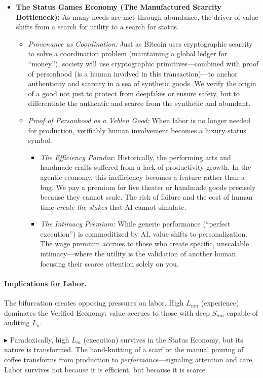 \documentclass[12pt, letter]{article}
\begin{document}
\begin{itemize}
    \item \textbf{The Status Games Economy (The Manufactured Scarcity Bottleneck):} As many needs are met through abundance, the driver of value shifts from a search for utility to a search for status.
    \begin{itemize}
        \item \textit{Provenance as Coordination:} Just as Bitcoin uses cryptographic scarcity to solve a coordination problem (maintaining a global ledger for ``money''), society will use cryptographic primitives---combined with proof of personhood (is a human involved in this transaction)---to anchor authenticity and scarcity in a sea of synthetic goods. We verify the origin of a good not just to protect from deepfakes or ensure safety, but to differentiate the authentic and scarce from the synthetic and abundant.
        \item \textit{Proof of Personhood as a Veblen Good:} When labor is no longer needed for production, verifiably human involvement becomes a luxury status symbol.
        \begin{itemize}
            \item \textit{The Efficiency Paradox:} Historically, the performing arts and handmade crafts suffered from a lack of productivity growth. In the agentic economy, this inefficiency becomes a feature rather than a bug. We pay a premium for live theater or handmade goods precisely because they cannot scale. The risk of failure and the cost of human time \emph{create the stakes} that AI cannot simulate.
            \item \textit{The Intimacy Premium:} While generic performance (``perfect execution'') is commoditized by AI, value shifts to personalization. The wage premium accrues to those who create specific, unscalable intimacy---where the utility is the validation of another human focusing their scarce attention solely on you.
        \end{itemize}
    \end{itemize}
\end{itemize}


\paragraph{Implications for Labor.}
The bifurcation creates opposing pressures on labor. High $L_{nm}$ (experience) dominates the Verified Economy: value accrues to those with deep $S_{nm}$ capable of auditing $L_a$. 

$\blacktriangleright$ Paradoxically, high $L_m$ (execution) survives in the Status Economy, but its nature is transformed. The hand-knitting of a scarf or the manual pouring of coffee transforms from production to \emph{performance}---signaling attention and care. Labor survives not because it is efficient, but because it is scarce.
\end{document}
